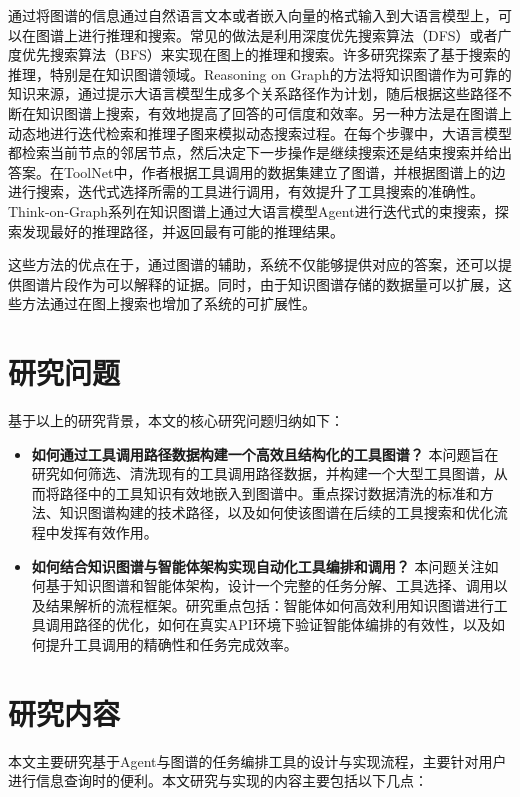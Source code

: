 通过将图谱的信息通过自然语言文本或者嵌入向量的格式输入到大语言模型上，可以在图谱上进行推理和搜索。常见的做法是利用深度优先搜索算法（DFS）或者广度优先搜索算法（BFS）来实现在图上的推理和搜索。许多研究探索了基于搜索的推理，特别是在知识图谱领域。Reasoning on Graph\cite{Luo2023}的方法将知识图谱作为可靠的知识来源，通过提示大语言模型生成多个关系路径作为计划，随后根据这些路径不断在知识图谱上搜索，有效地提高了回答的可信度和效率。另一种方法是在图谱上动态地进行迭代检索和推理子图来模拟动态搜索过程\cite{Liu2024, Sun2023, Ma2024}。在每个步骤中，大语言模型都检索当前节点的邻居节点，然后决定下一步操作是继续搜索还是结束搜索并给出答案。在ToolNet\cite{Liu2024}中，作者根据工具调用的数据集建立了图谱，并根据图谱上的边进行搜索，迭代式选择所需的工具进行调用，有效提升了工具搜索的准确性。Think-on-Graph系列\cite{Sun2023,Ma2024}在知识图谱上通过大语言模型Agent进行迭代式的束搜索，探索发现最好的推理路径，并返回最有可能的推理结果。

这些方法的优点在于，通过图谱的辅助，系统不仅能够提供对应的答案，还可以提供图谱片段作为可以解释的证据。同时，由于知识图谱存储的数据量可以扩展，这些方法通过在图上搜索也增加了系统的可扩展性。

\section{研究问题}

基于以上的研究背景，本文的核心研究问题归纳如下：
\begin{itemize}
    \item \textbf{如何通过工具调用路径数据构建一个高效且结构化的工具图谱？}
   本问题旨在研究如何筛选、清洗现有的工具调用路径数据，并构建一个大型工具图谱，从而将路径中的工具知识有效地嵌入到图谱中。重点探讨数据清洗的标准和方法、知识图谱构建的技术路径，以及如何使该图谱在后续的工具搜索和优化流程中发挥有效作用。
    \item \textbf{如何结合知识图谱与智能体架构实现自动化工具编排和调用？}
   本问题关注如何基于知识图谱和智能体架构，设计一个完整的任务分解、工具选择、调用以及结果解析的流程框架。研究重点包括：智能体如何高效利用知识图谱进行工具调用路径的优化，如何在真实API环境下验证智能体编排的有效性，以及如何提升工具调用的精确性和任务完成效率。
\end{itemize}

\section{研究内容}
本文主要研究基于Agent与图谱的任务编排工具的设计与实现流程，主要针对用户进行信息查询时的便利。本文研究与实现的内容主要包括以下几点：

